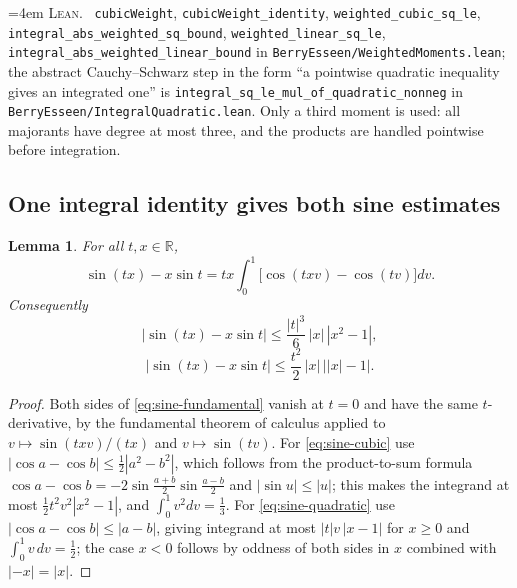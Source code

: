 \documentclass[10pt,a4paper]{article}
\theoremstyle{plain}
\newtheorem{lemma}[theorem]{Lemma}
\theoremstyle{definition}
\newcommand{\R}{\mathbb{R}}
\newcommand{\lean}[1]{\texttt{#1}}
\newcommand{\file}[1]{\texttt{#1}}
\newenvironment{leanref}%
  {\par\addvspace{3pt}\begingroup\sloppy\emergencystretch=4em
   \noindent\footnotesize\textsc{Lean.}\ \ignorespaces}%
  {\par\endgroup\addvspace{3pt}}
\begin{document}
\begin{leanref}
\lean{cubicWeight}, \lean{cubicWeight\_identity}, \lean{weighted\_cubic\_sq\_le},
\lean{integral\_abs\_weighted\_sq\_bound}, \lean{weighted\_linear\_sq\_le},
\lean{integral\_abs\_weighted\_linear\_bound} in
\file{BerryEsseen/WeightedMoments.lean}; the abstract Cauchy--Schwarz step in
the form ``a pointwise quadratic inequality gives an integrated one'' is
\lean{integral\_sq\_le\_mul\_of\_quadratic\_nonneg} in
\file{BerryEsseen/IntegralQuadratic.lean}. Only a third moment is used: all
majorants have degree at most three, and the products are handled pointwise
before integration.
\end{leanref}

\subsection{One integral identity gives both sine estimates}

\begin{lemma}\label{lem:sine-identity}
For all $t,x\in\R$,
\begin{equation}\label{eq:sine-fundamental}
  \sin(tx) - x\sin t = tx\int_0^1\bigl[\cos(txv)-\cos(tv)\bigr]dv .
\end{equation}
Consequently
\begin{equation}\label{eq:sine-cubic}
  \bigl|\sin(tx)-x\sin t\bigr| \le \frac{|t|^3}{6}\,|x|\,|x^2-1| ,
\end{equation}
\begin{equation}\label{eq:sine-quadratic}
  \bigl|\sin(tx)-x\sin t\bigr| \le \frac{t^2}{2}\,|x|\,\bigl||x|-1\bigr| .
\end{equation}
\end{lemma}

\begin{proof}
Both sides of \eqref{eq:sine-fundamental} vanish at $t=0$ and have the same
$t$-derivative, by the fundamental theorem of calculus applied to
$v\mapsto\sin(txv)/ (tx)$ and $v\mapsto\sin(tv)$. For
\eqref{eq:sine-cubic} use $|\cos a-\cos b|\le\tfrac12|a^2-b^2|$, which follows
from the product-to-sum formula
$\cos a-\cos b=-2\sin\frac{a+b}{2}\sin\frac{a-b}{2}$ and $|\sin u|\le|u|$;
this makes the integrand at most $\tfrac12 t^2v^2|x^2-1|$, and
$\int_0^1v^2dv=\tfrac13$. For \eqref{eq:sine-quadratic} use
$|\cos a-\cos b|\le|a-b|$, giving integrand at most $|t|v\,|x-1|$ for
$x\ge0$ and $\int_0^1v\,dv=\tfrac12$; the case $x<0$ follows by oddness of both
sides in $x$ combined with $|{-x}|=|x|$.
\end{proof}
\end{document}
